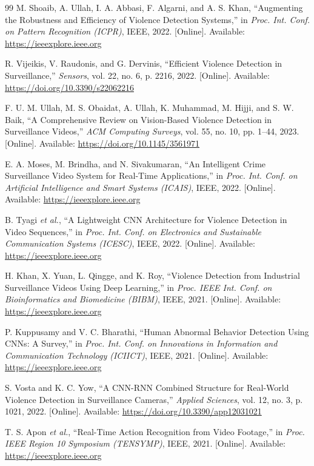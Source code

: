 \begin{thebibliography}{99}
M. Shoaib, A. Ullah, I. A. Abbasi, F. Algarni, and A. S. Khan, 
``Augmenting the Robustness and Efficiency of Violence Detection Systems,'' 
in \textit{Proc. Int. Conf. on Pattern Recognition (ICPR)}, IEEE, 2022. 
[Online]. Available: \url{https://ieeexplore.ieee.org}

R. Vijeikis, V. Raudonis, and G. Dervinis, 
``Efficient Violence Detection in Surveillance,'' 
\textit{Sensors}, vol. 22, no. 6, p. 2216, 2022. 
[Online]. Available: \url{https://doi.org/10.3390/s22062216}

F. U. M. Ullah, M. S. Obaidat, A. Ullah, K. Muhammad, M. Hijji, and S. W. Baik, 
``A Comprehensive Review on Vision-Based Violence Detection in Surveillance Videos,'' 
\textit{ACM Computing Surveys}, vol. 55, no. 10, pp. 1--44, 2023. 
[Online]. Available: \url{https://doi.org/10.1145/3561971}

E. A. Moses, M. Brindha, and N. Sivakumaran, 
``An Intelligent Crime Surveillance Video System for Real-Time Applications,'' 
in \textit{Proc. Int. Conf. on Artificial Intelligence and Smart Systems (ICAIS)}, IEEE, 2022. 
[Online]. Available: \url{https://ieeexplore.ieee.org}

B. Tyagi \textit{et al.}, 
``A Lightweight {CNN} Architecture for Violence Detection in Video Sequences,'' 
in \textit{Proc. Int. Conf. on Electronics and Sustainable Communication Systems (ICESC)}, IEEE, 2022. 
[Online]. Available: \url{https://ieeexplore.ieee.org}

H. Khan, X. Yuan, L. Qingge, and K. Roy, 
``Violence Detection from Industrial Surveillance Videos Using Deep Learning,'' 
in \textit{Proc. IEEE Int. Conf. on Bioinformatics and Biomedicine (BIBM)}, IEEE, 2021. 
[Online]. Available: \url{https://ieeexplore.ieee.org}

P. Kuppusamy and V. C. Bharathi, 
``Human Abnormal Behavior Detection Using {CNNs}: A Survey,'' 
in \textit{Proc. Int. Conf. on Innovations in Information and Communication Technology (ICIICT)}, IEEE, 2021. 
[Online]. Available: \url{https://ieeexplore.ieee.org}

S. Vosta and K. C. Yow, 
``A {CNN-RNN} Combined Structure for Real-World Violence Detection in Surveillance Cameras,'' 
\textit{Applied Sciences}, vol. 12, no. 3, p. 1021, 2022. 
[Online]. Available: \url{https://doi.org/10.3390/app12031021}

T. S. Apon \textit{et al.}, 
``Real-Time Action Recognition from Video Footage,'' 
in \textit{Proc. IEEE Region 10 Symposium (TENSYMP)}, IEEE, 2021. 
[Online]. Available: \url{https://ieeexplore.ieee.org}


\end{thebibliography}
